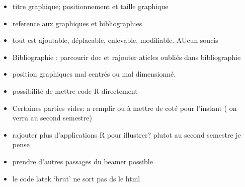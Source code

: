\documentclass[
]{report}
\providecommand{\tightlist}{%
  \setlength{\itemsep}{0pt}\setlength{\parskip}{0pt}}
\begin{document}
\begin{itemize}
\tightlist
\item
  titre graphique; positionnement et taille graphique
\item
  reference aux graphiques et bibliographies
\item
  tout est ajoutable, déplacable, enlevable, modifiable. AUcun soucis
\item
  Bibliographie : parcourir doc et rajouter aticles oubliés dans bibliographie
\item
  position graphiques mal centrés ou mal dimensionné.
\item
  possibilité de mettre code R directement
\item
  Certaines parties vides: a remplir ou à mettre de coté pour l'instant ( on verra au second semestre)
\item
  rajouter plus d'applications R pour illustrer? plutot au second semestre je pense
\item
  prendre d'autres passages du beamer possible
\item
  le code latek `brut' ne sort pas ds le html
\end{itemize}

  
\end{document}
